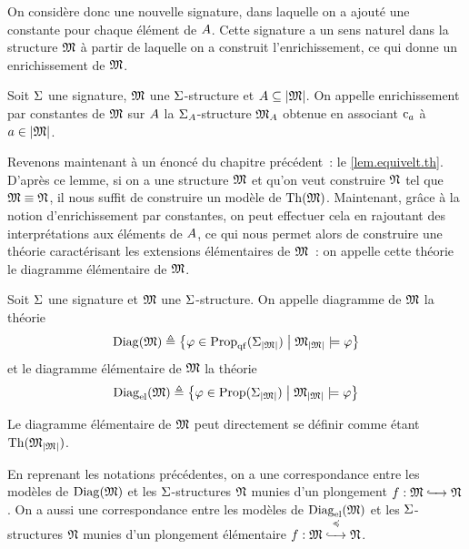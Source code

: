 On considère donc une nouvelle signature, dans laquelle on a ajouté une
constante pour chaque élément de $A$. Cette signature a un sens naturel
dans la structure $\mathfrak{M}$ à partir de laquelle on a construit l'enrichissement,
ce qui donne un enrichissement de $\mathfrak{M}$.

\begin{definition}
  Soit $\Sigma$ une signature, $\mathfrak{M}$ une $\Sigma$-structure et
  $A\subseteq\left\vert \mathfrak{M}\right\vert$. On appelle enrichissement par constantes de $\mathfrak{M}$
  sur $A$ la $\Sigma_{A}$-structure $\varMM_{\varPt}$ obtenue en
  associant $\mathrm{c}_a$ à $a\in\left\vert \mathfrak{M}\right\vert$.
  \index[notation]{$\varMM_{\varPt}$}
\end{definition}

Revenons maintenant à un énoncé du chapitre précédent~: le
\cref{lem.equivelt.th}. D'après ce lemme, si on a une structure $\mathfrak{M}$ et
qu'on veut construire $\mathfrak{N}$ tel que $\mathfrak{M}\equiv\mathfrak{N}$, il nous suffit de
construire un modèle de $\operatorname{Th}(\mathfrak{M})$. Maintenant, grâce à la notion
d'enrichissement par constantes, on peut effectuer cela en rajoutant des
interprétations aux éléments de $A$, ce qui nous permet alors de construire
une théorie caractérisant les extensions élémentaires de $\mathfrak{M}$~: on appelle
cette théorie le diagramme élémentaire de $\mathfrak{M}$.

\begin{definition}
  Soit $\Sigma$ une signature et $\mathfrak{M}$ une $\Sigma$-structure. On appelle
  diagramme de $\mathfrak{M}$ la théorie
  \[\operatorname{Diag}(\mathfrak{M}) \triangleq
  \left\{ \varphi\in\operatorname{Prop}_{\mathrm{qf}}(\Sigma_{\left\vert \mathfrak{M}\right\vert}) \;\middle\vert\; \mathfrak{M}_{\left\vert \mathfrak{M}\right\vert}\models\varphi \right\}\]
  et le diagramme élémentaire de $\mathfrak{M}$ la théorie
  \[\operatorname{Diag}_{\mathrm{el}}(\mathfrak{M})\triangleq
  \left\{ \varphi\in\operatorname{Prop}(\Sigma_{\left\vert \mathfrak{M}\right\vert}) \;\middle\vert\; \mathfrak{M}_{\left\vert \mathfrak{M}\right\vert}\models\varphi \right\}\]
\end{definition}

\begin{remark}
  Le diagramme élémentaire de $\mathfrak{M}$ peut directement se définir comme
  étant $\operatorname{Th}(\mathfrak{M}_{\left\vert \mathfrak{M}\right\vert})$.
\end{remark}

\begin{proposition}
  En reprenant les notations précédentes, on a une correspondance entre
  les modèles de $\operatorname{Diag}(\mathfrak{M})$ et les $\Sigma$-structures $\mathfrak{N}$ munies d'un
  plongement $f : \displaystyle \mathfrak{M} \xhookrightarrow{\quad} \mathfrak{N}$. On a aussi une
  correspondance entre les modèles de $\operatorname{Diag}_{\mathrm{el}}(\mathfrak{M})$ et les
  $\Sigma$-structures $\mathfrak{N}$ munies d'un plongement élémentaire
  $f : \displaystyle \mathfrak{M} \overset{\preccurlyeq}{\xhookrightarrow{\quad}} \mathfrak{N}$.
\end{proposition}

